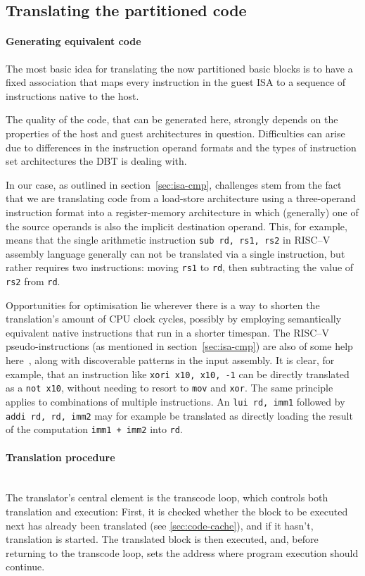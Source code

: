 
\subsection{Translating the partitioned code}
\paragraph{Generating equivalent code}
The most basic idea for translating the now partitioned basic blocks is to have a fixed association that maps every instruction in the guest ISA to a sequence of instructions native to the host.

The quality of the code, that can be generated here, strongly depends on the properties of the host and guest architectures in question.
Difficulties can arise due to differences in the instruction operand formats and the types of instruction set architectures the DBT is dealing with.

In our case, as outlined in section~\ref{sec:isa-cmp}, challenges stem from the fact that we are translating code from a load-store architecture using a three-operand instruction format into a register-memory architecture in which (generally) one of the source operands is also the implicit destination operand.
This, for example, means that the single arithmetic instruction \texttt{sub~rd,~rs1,~rs2} in RISC--V assembly language generally can not be translated via a single instruction, but rather requires two instructions: moving \texttt{rs1} to \texttt{rd}, then subtracting the value of \texttt{rs2} from \texttt{rd}.

Opportunities for optimisation lie wherever there is a way to shorten the translation's amount of CPU clock cycles, possibly by employing semantically equivalent native instructions that run in a shorter timespan.
The RISC--V pseudo-instructions (as mentioned in section~\ref{sec:isa-cmp}) are also of some help here~\cite[S. 139]{riscvspec}, along with discoverable patterns in the input assembly.
It is clear, for example, that an instruction like \texttt{xori~x10,~x10,~-1} can be directly translated as a \texttt{not x10}, without needing to resort to \texttt{mov} and \texttt{xor}.
The same principle applies to combinations of multiple instructions.
An \texttt{lui~rd,~imm1} followed by \texttt{addi~rd,~rd,~imm2} may for example be translated as directly loading the result of the computation \texttt{imm1~+~imm2} into \texttt{rd}.

\paragraph{Translation procedure} \mbox{}\\
The translator's central element is the transcode loop, which controls both translation and execution:
First, it is checked whether the block to be executed next has already been translated (see \ref{sec:code-cache}), and if it hasn't, translation is started.
The translated block is then executed, and, before returning to the transcode loop, sets the address where program execution should continue.

